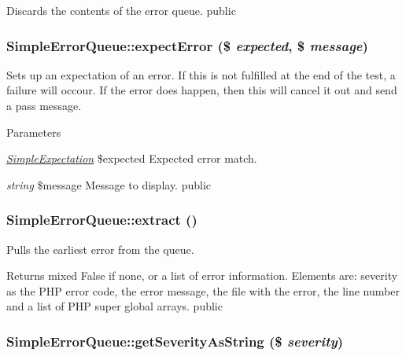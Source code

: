\label{class_simple_error_queue_a35fde0c9340bed6665ac8a16d66f9501}
Discards the contents of the error queue.  public \hypertarget{class_simple_error_queue_a44aac221d1d5eee6a81d84d57330b2b8}{
\subsubsection[{expectError}]{\setlength{\rightskip}{0pt plus 5cm}SimpleErrorQueue::expectError (\$ {\em expected}, \/  \$ {\em message})}}
\label{class_simple_error_queue_a44aac221d1d5eee6a81d84d57330b2b8}
Sets up an expectation of an error. If this is not fulfilled at the end of the test, a failure will occour. If the error does happen, then this will cancel it out and send a pass message. 
\begin{DoxyParams}{Parameters}
\item[{\em \hyperlink{class_simple_expectation}{SimpleExpectation}}]\$expected Expected error match. \item[{\em string}]\$message Message to display.  public \end{DoxyParams}
\hypertarget{class_simple_error_queue_a32d8279b377c3cfbcacbb9ac797c9297}{
\subsubsection[{extract}]{\setlength{\rightskip}{0pt plus 5cm}SimpleErrorQueue::extract ()}}
\label{class_simple_error_queue_a32d8279b377c3cfbcacbb9ac797c9297}
Pulls the earliest error from the queue. \begin{DoxyReturn}{Returns}
mixed False if none, or a list of error information. Elements are: severity as the PHP error code, the error message, the file with the error, the line number and a list of PHP super global arrays.  public 
\end{DoxyReturn}
\hypertarget{class_simple_error_queue_a686f876e93208736cee9fd57dc8223d9}{
\subsubsection[{getSeverityAsString}]{\setlength{\rightskip}{0pt plus 5cm}SimpleErrorQueue::getSeverityAsString (\$ {\em severity})}}
